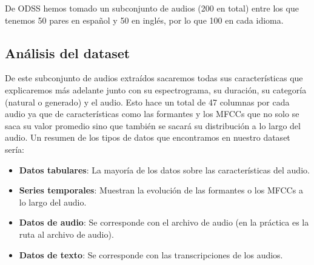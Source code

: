 De ODSS hemos tomado un subconjunto de audios (200 en total) entre los que tenemos 50 pares en español y 50 en inglés, por lo que 100 en cada idioma.

\subsection*{Análisis del dataset}

De este subconjunto de audios extraídos sacaremos todas sus características que explicaremos más adelante junto con su espectrograma, su duración, su categoría (natural o generado) y el audio. Esto hace un total de 47 columnas por cada audio ya que de características como las formantes y los MFCCs que no solo se saca su valor promedio sino que también se sacará su distribución a lo largo del audio. Un resumen de los tipos de datos que encontramos en nuestro dataset sería:

\begin{itemize}
  \item \textbf{Datos tabulares}: La mayoría de los datos sobre las características del audio.
  \item \textbf{Series temporales}: Muestran la evolución de las formantes o los MFCCs a lo largo del audio.
  \item \textbf{Datos de audio}: Se corresponde con el archivo de audio (en la práctica es la ruta al archivo de audio).
  \item \textbf{Datos de texto}: Se corresponde con las transcripciones de los audios.
\end{itemize}